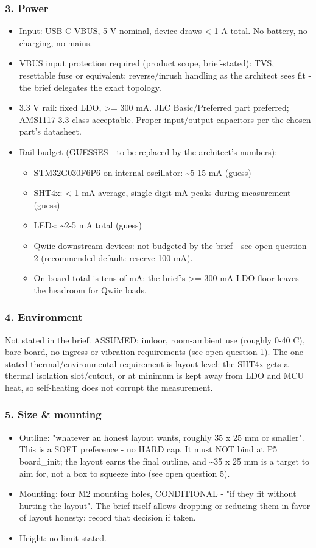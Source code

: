 \documentclass[11pt,a4paper]{article}
\begin{document}
\subsubsection*{3. Power}
\begin{itemize}
\item Input: USB-C VBUS, 5 V nominal, device draws \textless{} 1 A total. No battery, no
charging, no mains.
\item VBUS input protection required (product scope, brief-stated): TVS,
resettable fuse or equivalent; reverse/inrush handling as the architect
sees fit - the brief delegates the exact topology.
\item 3.3 V rail: fixed LDO, \textgreater{}= 300 mA. JLC Basic/Preferred part preferred;
AMS1117-3.3 class acceptable. Proper input/output capacitors per the chosen
part's datasheet.
\item Rail budget (GUESSES - to be replaced by the architect's numbers):
\begin{itemize}
\item STM32G030F6P6 on internal oscillator: \textasciitilde{}5-15 mA (guess)
\item SHT4x: \textless{} 1 mA average, single-digit mA peaks during measurement (guess)
\item LEDs: \textasciitilde{}2-5 mA total (guess)
\item Qwiic downstream devices: not budgeted by the brief - see open
question 2 (recommended default: reserve 100 mA).
\item On-board total is tens of mA; the brief's \textgreater{}= 300 mA LDO floor leaves the
headroom for Qwiic loads.
\end{itemize}
\end{itemize}
\subsubsection*{4. Environment}
Not stated in the brief. ASSUMED: indoor, room-ambient use (roughly 0-40 C), bare board, no ingress or vibration requirements (see open question 1). The one stated thermal/environmental requirement is layout-level: the SHT4x gets a thermal isolation slot/cutout, or at minimum is kept away from LDO and MCU heat, so self-heating does not corrupt the measurement.

\subsubsection*{5. Size \& mounting}
\begin{itemize}
\item Outline: "whatever an honest layout wants, roughly 35 x 25 mm or smaller".
This is a SOFT preference - no HARD cap. It must NOT bind at P5
board\_init; the layout earns the final outline, and \textasciitilde{}35 x 25 mm is a
target to aim for, not a box to squeeze into (see open question 5).
\item Mounting: four M2 mounting holes, CONDITIONAL - "if they fit without
hurting the layout". The brief itself allows dropping or reducing them in
favor of layout honesty; record that decision if taken.
\item Height: no limit stated.
\end{itemize}
\end{document}
